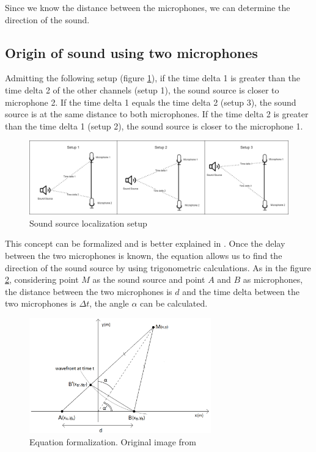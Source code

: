 Since we know the distance between the microphones, we can determine the direction of the sound.

\subsection{Origin of sound using two microphones}

Admitting the following setup (figure \ref*{fig:microphones_setup}), if the time delta 1 is greater than the time delta 2 of the other channels (setup 1), the sound source is closer to microphone 2. If the time delta 1 equals the time delta 2 (setup 3), the sound source is at the same distance to both microphones. If the time delta 2 is greater than the time delta 1 (setup 2), the sound source is closer to the microphone 1. 

\begin{figure}[H]
    \centering
    \includegraphics[width=1\textwidth]{../Images/microphones_setups.png}
    \caption{Sound source localization setup}
    \label{fig:microphones_setup}
\end{figure}

This concept can be formalized and is better explained in \cite{Scola2010DirectionOA}. Once the delay between the two microphones is known, the equation allows us to find the direction of the sound source by using trigonometric calculations. As in the figure \ref*{fig:sound-source-from-two-microphones}, considering point $M$ as the sound source and point $A$ and $B$ as microphones, the distance between the two microphones is $d$ and the time delta between the two microphones is $\Delta t$, the angle $\alpha$ can be calculated.

\begin{figure}[H]
    \centering
    \includegraphics[width=0.7\textwidth]{../Images/sound-source-from-two-microphones.png}
    \caption{Equation formalization. Original image from \cite{Scola2010DirectionOA}}
    \label{fig:sound-source-from-two-microphones}
\end{figure}

